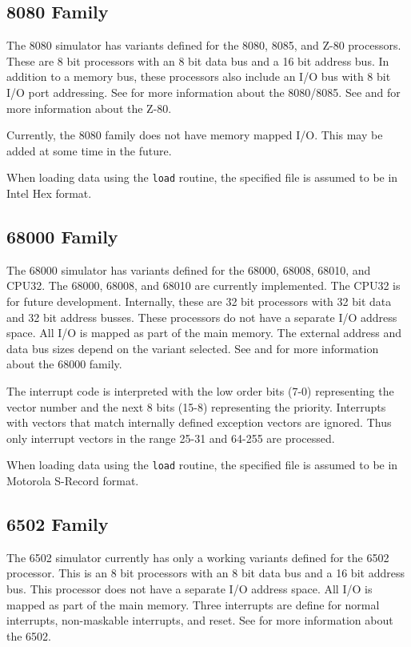 \documentclass[10pt, openany]{book}
\newcommand{\function}[1]{\texttt{#1}}
\begin{document}
\subsection{8080 Family}
The 8080 simulator has variants defined for the 8080, 8085, and Z-80 processors.
These are 8 bit processors with an 8 bit data bus and a 16 bit address bus.
In addition to a memory bus, these processors also include an I/O bus with 8 bit I/O port addressing.
See \cite{i8080} for more information about the 8080/8085.
See \cite{z80} and \cite{z80undoc} for more information about the Z-80.

Currently, the 8080 family does not have memory mapped I/O.  This may be added at some time in the future.

When loading data using the \function{load} routine, the specified file is assumed to be in Intel Hex format.

\subsection{68000 Family}
The 68000 simulator has variants defined for the 68000, 68008, 68010, and CPU32.
The 68000, 68008, and 68010 are currently implemented.
The CPU32 is for future development.
Internally, these are 32 bit processors with 32 bit data and 32 bit address busses.
These processors do not have a separate I/O address space.
All I/O is mapped as part of the main memory.
The external address and data bus sizes depend on the variant selected.
See \cite{m68000a} and \cite{m68000b} for more information about the 68000 family.

The interrupt code is interpreted with the low order bits (7-0) representing the vector number and the next 8 bits (15-8) representing the priority.
Interrupts with vectors that match internally defined exception vectors are ignored.
Thus only interrupt vectors in the range 25-31 and 64-255 are processed.

When loading data using the \function{load} routine, the specified file is assumed to be in Motorola S-Record format.

\subsection{6502 Family}
The 6502 simulator currently has only a working variants defined for the 6502 processor.
This is an 8 bit processors with an 8 bit data bus and a 16 bit address bus.
This processor does not have a separate I/O address space.
All I/O is mapped as part of the main memory.
Three interrupts are define for normal interrupts, non-maskable interrupts, and reset.
See \cite{msc6502} for more information about the 6502.
\end{document}

